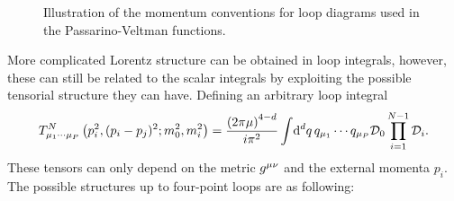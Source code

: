 \documentclass[../main.tex]{subfiles}
\begin{document}
\begin{figure}[ht!]
    \centering
    \begin{subfigure}{0.49\linewidth}
        \centering
        \caption{}
        \label{qft:fig:PV_triloop_conventions}
    \end{subfigure}
    \begin{subfigure}{0.49\linewidth}
        \centering
        \caption{}
        \label{qft:fig:PV_boxloop_conventions}
    \end{subfigure}
    \caption{Illustration of the momentum conventions for loop diagrams used in the Passarino-Veltman functions.}
    \label{qft:fig:PV_loop_conventions}
\end{figure}

More complicated Lorentz structure can be obtained in loop integrals, however,
these can still be related to the scalar integrals by exploiting the possible
tensorial structure they can have. Defining an arbitrary loop integral
\begin{equation}
    T^N_{\mu_1\cdots\mu_P}\left(p_i^2, (p_i-p_j)^2; m_0^2, m_i^2\right) = \frac{\left(2\pi \mu\right)^{4-d}}{i \pi^2} \int \!\mathrm{d}^d q\, q_{\mu_1}\cdots q_{\mu_P} \mathcal{D}_0 \prod_{i=1}^{N-1} \mathcal{D}_i.
\end{equation}
These tensors can only depend on the metric \(\tensor{g}{^\mu^\nu}\) and the external momenta \(p_i\).
The possible structures up to four-point loops are as following:
\end{document}
